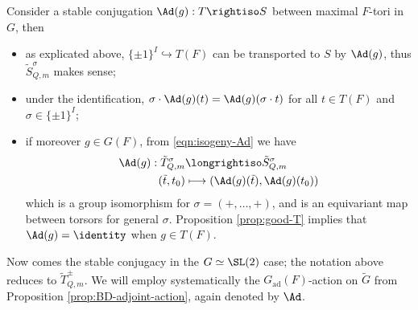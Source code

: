 \documentclass[a4paper,10pt]{article}
\begin{document}
Consider a stable conjugation $\Ad(g): T \rightiso S$ between maximal $F$-tori in $G$, then
\begin{itemize}
	\item as explicated above, $\{\pm 1\}^I \hookrightarrow T(F)$ can be transported to $S$ by $\Ad(g)$, thus $\tilde{S}^\sigma_{Q,m}$ makes sense;
	\item under the identification, $\sigma \cdot \Ad(g)(t) = \Ad(g)(\sigma \cdot t)$ for all $t \in T(F)$ and $\sigma \in \{\pm 1\}^I$; 
	\item if moreover $g \in G(F)$, from \eqref{eqn:isogeny-Ad} we have
	\begin{align*}
		\Ad(g): \tilde{T}^\sigma_{Q,m} & \longrightiso \tilde{S}^\sigma_{Q,m} \\
		(\tilde{t}, t_0) & \longmapsto (\Ad(g)(\tilde{t}), \Ad(g)(t_0))
	\end{align*}
	which is a group isomorphism for $\sigma = (+, \ldots, +)$, and is an equivariant map between torsors for general $\sigma$. Proposition \ref{prop:good-T} implies that $\Ad(g) = \identity$ when $g \in T(F)$.
\end{itemize}

Now comes the stable conjugacy in the $G \simeq \SL(2)$ case; the notation above reduces to $\tilde{T}^\pm_{Q,m}$. We will employ systematically the $G_\text{ad}(F)$-action on $\tilde{G}$ from Proposition \ref{prop:BD-adjoint-action}, again denoted by $\Ad$.
\end{document}
